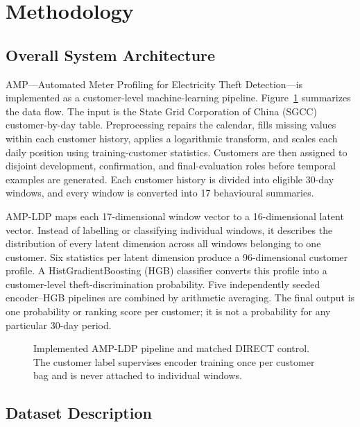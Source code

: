\section{Methodology}\label{sec:methodology}

\subsection{Overall System Architecture}\label{sec:architecture}

AMP---Automated Meter Profiling for Electricity Theft Detection---is implemented as a customer-level machine-learning pipeline. Figure~\ref{fig:amp-architecture} summarizes the data flow. The input is the State Grid Corporation of China (SGCC) customer-by-day table. Preprocessing repairs the calendar, fills missing values within each customer history, applies a logarithmic transform, and scales each daily position using training-customer statistics. Customers are then assigned to disjoint development, confirmation, and final-evaluation roles before temporal examples are generated. Each customer history is divided into eligible 30-day windows, and every window is converted into 17 behavioural summaries.

AMP-LDP maps each 17-dimensional window vector to a 16-dimensional latent vector. Instead of labelling or classifying individual windows, it describes the distribution of every latent dimension across all windows belonging to one customer. Six statistics per latent dimension produce a 96-dimensional customer profile. A HistGradientBoosting (HGB) classifier converts this profile into a customer-level theft-discrimination probability. Five independently seeded encoder--HGB pipelines are combined by arithmetic averaging. The final output is one probability or ranking score per customer; it is not a probability for any particular 30-day period.

\begin{figure}[t]
  \centering
  
  \caption{Implemented AMP-LDP pipeline and matched DIRECT control. The customer label supervises encoder training once per customer bag and is never attached to individual windows.}
  \label{fig:amp-architecture}
\end{figure}

\subsection{Dataset Description}\label{sec:dataset}

